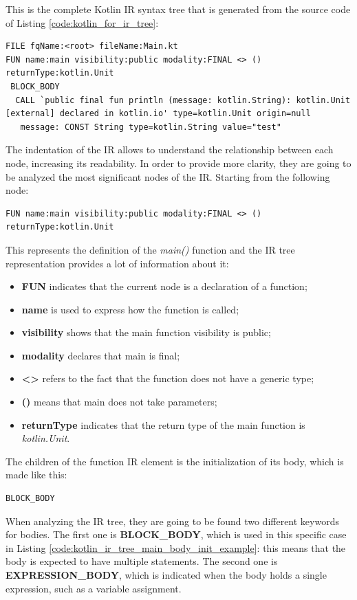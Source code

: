 This is the complete Kotlin IR syntax tree that is generated from the source code of Listing \ref{code:kotlin_for_ir_tree}:
\begin{lstlisting}[caption={Kotlin IR tree of Listing \ref{code:kotlin_for_ir_tree}}, captionpos=b, basicstyle=\small, label={code:kotlin_ir_tree_example}]
FILE fqName:<root> fileName:Main.kt
FUN name:main visibility:public modality:FINAL <> () returnType:kotlin.Unit
 BLOCK_BODY
  CALL `public final fun println (message: kotlin.String): kotlin.Unit [external] declared in kotlin.io' type=kotlin.Unit origin=null
   message: CONST String type=kotlin.String value="test"
\end{lstlisting}
The indentation of the IR allows to understand the relationship between each node, increasing its readability. In order to provide more clarity, they are going to be analyzed the most significant nodes of the IR.\newline
Starting from the following node:
\begin{lstlisting}[caption={Kotlin IR tree of the main function in Listing \ref{code:kotlin_for_ir_tree}}, captionpos=b, label={code:kotlin_ir_tree_main_example}]
FUN name:main visibility:public modality:FINAL <> () returnType:kotlin.Unit
\end{lstlisting}
This represents the definition of the \textit{main()} function and the IR tree representation provides a lot of information about it:
\begin{itemize}
    \item \textbf{FUN} indicates that the current node is a declaration of a function;
    \item \textbf{name} is used to express how the function is called;
    \item \textbf{visibility} shows that the main function visibility is public;
    \item \textbf{modality} declares that main is final;
    \item \textbf{<>} refers to the fact that the function does not have a generic type;
    \item \textbf{()} means that main does not take parameters;
    \item \textbf{returnType} indicates that the return type of the main function is \textit{kotlin.Unit}.
\end{itemize}

The children of the function IR element is the initialization of its body, which is made like this:
\begin{lstlisting}[caption={Kotlin IR tree of the body block of the main function in Listing \ref{code:kotlin_for_ir_tree}}, captionpos=b, label={code:kotlin_ir_tree_main_body_init_example}]
BLOCK_BODY
\end{lstlisting}
When analyzing the IR tree, they are going to be found two different keywords for bodies. The first one is \textbf{BLOCK\_BODY}, which is used in this specific case in Listing \ref{code:kotlin_ir_tree_main_body_init_example}: this means that the body is expected to have multiple statements. The second one is \textbf{EXPRESSION\_BODY}, which is indicated when the body holds a single expression, such as a variable assignment.

